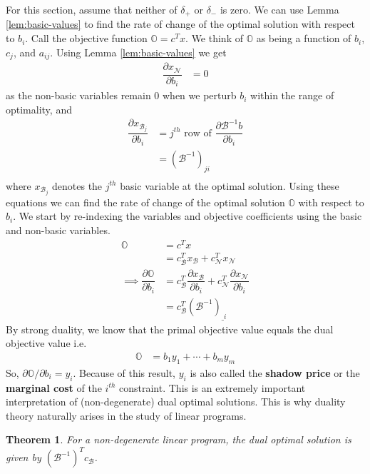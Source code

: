 \documentclass[
]{book}
\newtheorem{theorem}{Theorem}[chapter]
\theoremstyle{definition}
\theoremstyle{definition}
\theoremstyle{definition}
\theoremstyle{definition}
\theoremstyle{remark}
\begin{document}
For this section, assume that neither of \(\delta_+\) or \(\delta_-\) is zero. We can use Lemma
\ref{lem:basic-values} to find the rate of change of the optimal solution with respect to \(b_i\).
Call the objective function \(\mathbb{O} = c^{T} x\). We think of \(\mathbb{O}\) as being a function of
\(b_i\), \(c_j\), and \(a_{ij}.\) Using Lemma \ref{lem:basic-values} we get
\begin{align*}
  \dfrac{\partial x_{\mathcal{N}}}{\partial b_i} 
    &= 0
\end{align*}
as the non-basic variables remain 0 when we perturb \(b_i\) within the range of optimality, and
\begin{align*}
  \dfrac{\partial x_{\mathcal{B}_j}}{\partial b_i} 
    &= j^{th} \mbox{ row of } \dfrac{\partial \mathcal{B}^{-1}b}{\partial b_i} \\
    &= (\mathcal{B}^{-1})_{ji} \\
\end{align*}
where \(x_{\mathcal{B}_j}\) denotes the \(j^{th}\) basic variable at the optimal solution. Using these
equations we can find the rate of change of the optimal solution \(\mathbb{O}\) with respect to \(b_i\).
We start by re-indexing the variables and objective coefficients using the basic and non-basic
variables.
\begin{align*}
  \mathbb{O} 
    &= c^T x \\
    &= c^T_{\mathcal{B}} x_{\mathcal{B}} + c^T_{\mathcal{N}} x_{\mathcal{N}} \\
\implies
  \dfrac{\partial \mathbb{O}}{\partial b_i} 
    &= c^T_{\mathcal{B}} \dfrac{\partial x_{\mathcal{B}}}{\partial b_i} + c^T_{\mathcal{N}} \dfrac{\partial x_{\mathcal{N}}}{\partial b_i} \\
    &= c^T_{\mathcal{B}} (\mathcal{B}^{-1})_{\_i}
\end{align*}
By strong duality, we know that the primal objective value equals the dual objective value i.e.~
\begin{align*}
 \mathbb{O} &= b_1 y_1 + \cdots + b_m y_m 
\end{align*}
So, \(\partial \mathbb{O}/\partial b_i = y_i\). Because of this result, \(y_i\) is also called the
\textbf{shadow price} or the \textbf{marginal cost} of the \(i^{th}\) constraint. This is an extremely important
interpretation of (non-degenerate) dual optimal solutions. This is why duality theory naturally
arises in the study of linear programs.

\begin{theorem}
\protect\hypertarget{thm:dual-solution}{}\label{thm:dual-solution}For a non-degenerate linear program, the dual optimal solution is given by \((\mathcal{B}^{-1})^Tc_{\mathcal{B}}\).
\end{theorem}
\end{document}
